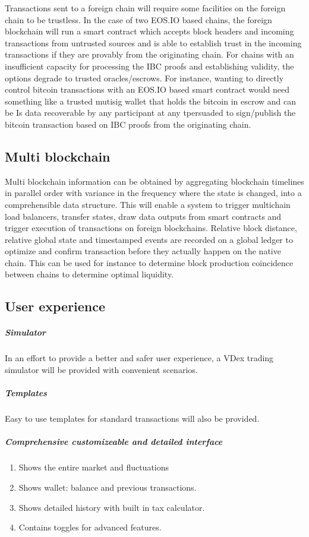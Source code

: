 \documentclass[]{article}
\begin{document}
	Transactions sent to a foreign chain will require some facilities on the foreign chain to be trustless. 
	In the case of two EOS.IO based chains, the foreign blockchain will run a smart contract which accepts block headers and incoming transactions 
	from untrusted sources and is able to establish trust in the incoming transactions if they are provably from the originating chain. 
	For chains with an insufficient capacity for processing the IBC proofs and establishing validity, 
	the options degrade to trusted oracles/escrows.
	For instance, wanting to directly control bitcoin transactions with an EOS.IO based smart contract 
	would need something like a trusted mutisig wallet that holds the bitcoin in escrow 
	and can be 	Is data recoverable by any participant at any tpersuaded to sign/publish the bitcoin transaction 
	based on IBC proofs from the originating chain.\cite{3}
	
	
	\subsection{Multi blockchain}
	Multi blockchain information can be obtained by aggregating blockchain timelines in parallel order 
	with variance in the frequency where the state is changed, into a comprehensible data structure.
	This will enable a system to trigger multichain load balancers, transfer states, draw data outputs from smart contracts 
	and trigger execution of transactions on foreign blockchains. 
	Relative block distance, relative global state and timestamped events are recorded on a global ledger to optimize and confirm transaction 
	before they actually happen on the native chain.
	This can be used for instance to determine block production coincidence between chains to determine optimal liquidity.\cite{20}
	
	\subsection{User experience}
	\subparagraph{Simulator}
	In an effort to provide a better and safer user experience, 
	a VDex trading simulator will be provided with convenient scenarios.
	\subparagraph{Templates}
	Easy to use templates for standard transactions will also be provided.
	\subparagraph{Comprehensive customizeable and detailed interface}
	\begin{enumerate}
		\item Shows the entire market and fluctuations
		\item Shows wallet: balance and previous transactions.
		\item Shows detailed history with built in tax calculator.
		\item Contains toggles for advanced features.		 
	\end{enumerate}
	
\end{document}
